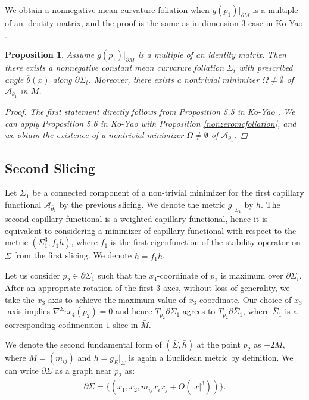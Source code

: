 \documentclass[11pt,letterpaper]{amsart}
\newtheorem{prop}{Proposition}[section]
\begin{document}
We obtain a nonnegative mean curvature foliation when $g(p_{1})|_{\partial M}$ is a multiple of an identity matrix, and the proof is the same as in dimension $3$ case in Ko-Yao \cite{koyao}.
\begin{prop} \label{nontrivialfirstminimizer} Assume $g(p_{1})|_{\partial M}$ is a multiple of an identity matrix. Then there exists a nonnegative constant mean curvature foliation $\Sigma_{t}$ with prescribed angle $\overline{\theta}(x)$ along $\partial \Sigma_{t}$. Moreover, there exists a nontrivial minimizer $\Omega \neq \emptyset$ of $\mathcal{A}_{\theta_{1}}$ in $M$.
\begin{proof} The first statement directly follows from Proposition 5.5 in Ko-Yao \cite{koyao}. We can apply Proposition 5.6 in Ko-Yao \cite{koyao} with Proposition \ref{nonzeromcfoliation}, and we obtain the existence of a nontrivial minimizer $\Omega \neq \emptyset$ of $\mathcal{A}_{\theta_{1}}$.
\end{proof}
\end{prop}
\subsection{Second Slicing}
Let $\Sigma_1$ be a connected component of a non-trivial minimizer for the first capillary functional $\mathcal{A}_{\bar{\theta}_{1}}$ by the previous slicing. We denote the metric $g|_{\Sigma_{1}}$ by $h$. The second capillary functional is a weighted capillary functional, hence it is equivalent to considering a minimizer of capillary functional with respect to the metric $(\Sigma_{1}^{3}, f_{1} h)$, where $f_{1}$ is the first eigenfunction of the stability operator on $\Sigma$ from the first slicing. We denote $\tilde{h}=f_{1}h$.

Let us consider $p_{2} \in \partial \Sigma_{1}$ such that the $x_{4}$-coordinate of $p_{2}$ is maximum over $\partial \Sigma_{i}$. After an appropriate rotation of the first $3$ axes, without loss of generality, we take the $x_{3}$-axis to achieve the maximum value of $x_{3}$-coordinate. Our choice of $x_{3}$-axis implies $\nabla^{\Sigma_{1}}x_{4}(p_{2})=0$ and hence $T_{p_{2}}\partial\Sigma_{1}$ agrees to $T_{p_{2}}\partial\bar{\Sigma}_{1}$, where $\bar{\Sigma}_{1}$ is a corresponding codimension $1$ slice in $\bar{M}$.


We denote the second fundamental form of $(\bar{\Sigma},\bar{h})$ at the point $p_2$ as $-2M$, where $M=(m_{ij})$ and $\bar{h}=g_{E}|_{\bar{\Sigma}}$ is again a Euclidean metric by definition. We can write $\partial\bar{\Sigma}$ as a graph near $p_2$ as:
\begin{align}
   \partial \bar{\Sigma}=\{(x_1,x_2,m_{ij}x_ix_j+O(|x|^3))\}.
\end{align}
\end{document}
